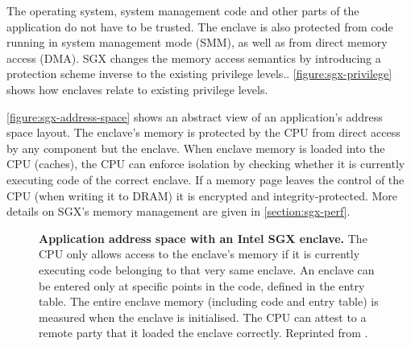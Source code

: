The operating system, system management code and other parts of the application do not have to be trusted.\label{ID_1978585841}
The enclave is also protected from code running in system management mode (SMM), as well as from direct memory access (DMA).\cite[]{McKeen2013}\label{ID_508054107}
SGX changes the memory access semantics by introducing a protection scheme inverse to the existing privilege levels.\cite[ch. 6.2]{sgx-explained}. \autoref{figure:sgx-privilege} shows how enclaves relate to existing privilege levels.\label{ID_607406159}

\autoref{figure:sgx-address-space} shows an abstract view of an application's address space layout.\label{ID_1645584733}
The enclave's memory is protected by the CPU from direct access by any component but the enclave.\label{ID_1772616683}
When enclave memory is loaded into the CPU (caches), the CPU can enforce isolation by checking whether it is currently executing code of the correct enclave.\label{ID_1309432999}
If a memory page leaves the control of the CPU (when writing it to DRAM) it is encrypted and integrity-protected.\cite[]{Gueron}\label{ID_308074010}
More details on SGX's memory management are given in \autoref{section:sgx-perf}.\label{ID_879539859}
\begin{figure}[htbp]
\makebox[\textwidth][c]{
}\caption{\textbf{Application address space with an Intel SGX enclave.}\label{ID_1596894882}
The CPU only allows access to the enclave's memory if it is currently executing code belonging to that very same enclave.\label{ID_811510196}
An enclave can be entered only at specific points in the code, defined in the entry table.\label{ID_1407494566}
The entire enclave memory (including code and entry table) is measured when the enclave is initialised. The CPU can attest to a remote party that it loaded the enclave correctly.\label{ID_1200889569}
Reprinted from \cite{McKeen2013}.\label{ID_1311428979}
\label{ID_1518668474}\label{figure:sgx-address-space}}
\end{figure}


